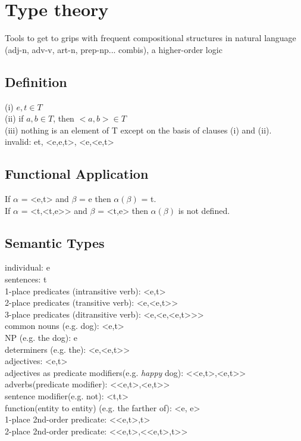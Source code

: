 \section{Type theory}
Tools to get to grips with frequent compositional structures in natural language (adj-n, adv-v, art-n, prep-np... combis), a higher-order logic
\subsection*{Definition}
(i) $e, t \in T$\\
(ii) if $a, b \in T$, then $<a, b> \in T$\\
(iii) nothing is an element of T except on the basis of clauses (i) and (ii).\\
invalid: et, <e,e,t>, <e,<e,t>
\subsection*{Functional Application}
If $\alpha$ = <e,t> and $\beta$ = e then $\alpha (\beta)$ = t. \\
If $\alpha$ = <t,<t,e>> and $\beta$ = <t,e> then $\alpha (\beta)$ is not defined.
\subsection*{Semantic Types}
individual: e \\
sentences: t \\
1-place predicates (intransitive verb): <e,t> \\
2-place predicates (transitive verb): <e,<e,t>> \\
3-place predicates (ditransitive verb): <e,<e,<e,t>>> \\
common nouns (e.g. dog): <e,t> \\
NP (e.g. the dog): e \\
determiners (e.g. the): <e,<e,t>> \\
adjectives: <e,t> \\
adjectives as predicate modifiers(e.g. \emph{happy} dog): <<e,t>,<e,t>> \\
adverbs(predicate modifier): <<e,t>,<e,t>> \\
sentence modifier(e.g. not): <t,t> \\
function(entity to entity) (e.g. the farther of): <e, e> \\
1-place 2nd-order predicate: <<e,t>,t> \\
2-place 2nd-order predicate: <<e,t>,<<e,t>,t>> 

